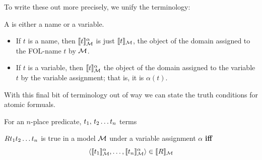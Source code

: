 To write these out more precisely, we unify the terminology:
\begin{definition}A  is either a name or a variable. 
	\begin{itemize}
		\item If $t$ is a name, then $\llbracket t\rrbracket^\alpha_{\mathcal{M}}$ is just $\llbracket t\rrbracket_{\mathcal{M}}$, the object of the domain assigned to the FOL-name $t$ by ${\mathcal{M}}$.
		\item If $t$ is a variable, then $\llbracket t\rrbracket^\alpha_{\mathcal{M}}$ the object of the domain assigned to the variable $t$ by the variable assignment; that is, it is $\alpha(t)$.
	\end{itemize}
\end{definition}



With this final bit of terminology out of way we can state the truth conditions for atomic formuals. 

\begin{definition}For  an $n$-place predicate, $t_1,\,t_2\ldots t_{n}$ terms
	
	$Rt_1t_2\ldots t_{n}$ is true in a model ${\mathcal{M}}$ under a variable assignment $\alpha$ \textbf{iff}\\
	$$\langle\llbracket t_1\rrbracket^\alpha_{\mathcal{M}},\ldots,\llbracket t_n\rrbracket^\alpha_{\mathcal{M}}\rangle\in\llbracket R\rrbracket_{\mathcal{M}}$$
\end{definition}



